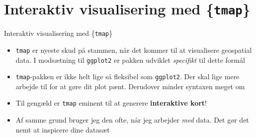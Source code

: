 \documentclass[
  8pt,
  ignorenonframetext,
  aspectratio=169]{beamer}
\begin{document}
\hypertarget{interaktiv-visualisering-med-tmap}{%
\section{\texorpdfstring{Interaktiv visualisering med
\{\texttt{tmap}\}}{Interaktiv visualisering med \{tmap\}}}\label{interaktiv-visualisering-med-tmap}}

\begin{frame}[fragile]{Interaktiv visualisering med \{\texttt{tmap}\}}
\protect\hypertarget{interaktiv-visualisering-med-tmap-1}{}
\begin{itemize}
\item
  \texttt{tmap} er nyeste skud på stammen, når det kommer til at
  visualisere geospatial data. I modsætning til \texttt{ggplot2} er
  pakken udviklet \emph{specifikt} til dette formål
\item
  \texttt{tmap}-pakken er ikke helt lige så fleksibel som
  \texttt{ggplot2}. Der skal lige mere arbejde til for at gøre dit plot
  pænt. Derudover minder syntaxen meget om
\item
  Til gengæld er \texttt{tmap} eminent til at generere
  \textbf{interaktive kort}!
\item
  Af samme grund bruger jeg den ofte, når jeg arbejder \emph{med} data.
  Det gør det nemt at inspicere dine datasæt
\end{itemize}
\end{frame}
\end{document}
